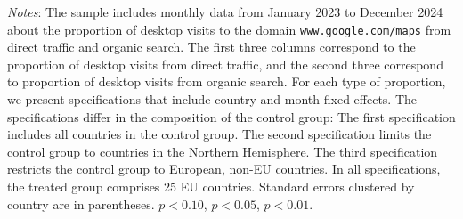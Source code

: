 \documentclass[11pt]{article}
\begin{document}
\begin{table}[!ht]
\begin{threeparttable}
			\begin{tablenotes}
				\item \footnotesize \emph{Notes}: The sample includes monthly data from January 2023 to December 2024 about the proportion of desktop visits to the domain \texttt{www.google.com/maps} from direct traffic and organic search. The first three columns correspond to the proportion of desktop visits from direct traffic, and the second three correspond to proportion of desktop visits from organic search. For each type of proportion, we present specifications that include country and month fixed effects. The specifications differ in the composition of the control group: The first specification includes all countries in the control group. The second specification limits the control group to countries in the Northern Hemisphere. The third specification restricts the control group to European, non-EU countries. In all specifications, the treated group comprises 25 EU countries. Standard errors clustered by country are in parentheses. \sym{*} \(p<0.10\), \sym{**} \(p<0.05\), \sym{***}  \(p<0.01\). 
			\end{tablenotes}
		\end{threeparttable}
	\end{table}
	
\end{document}
